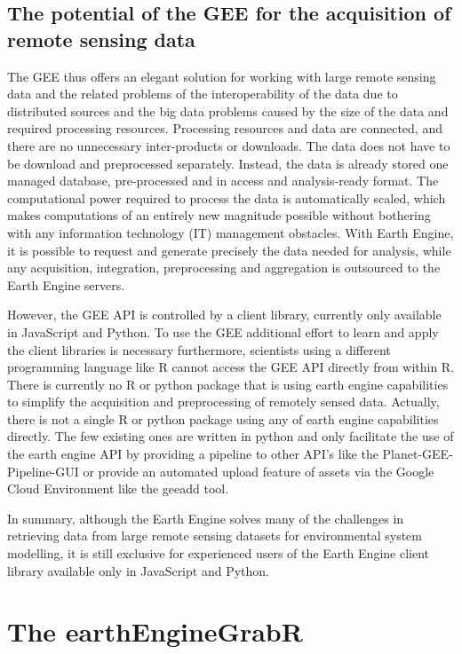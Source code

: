 \subsection{The potential of the GEE for the acquisition of remote sensing data}

The GEE thus offers an elegant solution for working with large remote sensing data and the related problems of the interoperability of the data due to distributed sources and the big data problems caused by the size of the data and required processing resources. 
Processing resources and data are connected, and there are no unnecessary inter-products or downloads. 
The data does not have to be download and preprocessed separately. Instead, the data is already stored one managed database, pre-processed and in access and analysis-ready format. 
The computational power required to process the data is automatically scaled, which makes computations of an entirely new magnitude possible without bothering with any information technology (IT) management obstacles.
With Earth Engine, it is possible to request and generate precisely the data needed for analysis, while any acquisition, integration, preprocessing and aggregation is outsourced to the Earth Engine servers. 

However, the GEE API is controlled by a client library, currently only available in JavaScript and Python. To use the GEE additional effort to learn and apply the client libraries is necessary furthermore, scientists using a different programming language like R cannot access the GEE API directly from within R.
There is currently no R or python package that is using earth engine capabilities to simplify the acquisition and preprocessing of remotely sensed data. Actually, there is not a single R or python package using any of earth engine capabilities directly. The few existing ones are written in python and only facilitate the use of the earth engine API by providing a pipeline to other API's like the Planet-GEE-Pipeline-GUI or provide an automated upload feature of assets via the Google Cloud Environment like the geeadd tool.

In summary, although the Earth Engine solves many of the challenges in retrieving data from large remote sensing datasets for environmental system modelling, it is still exclusive for experienced users of the Earth Engine client library available only in JavaScript and Python.

\section{The earthEngineGrabR}


